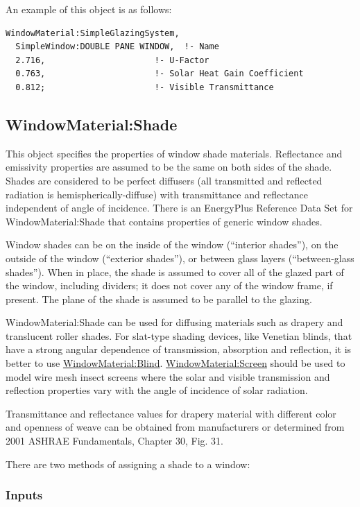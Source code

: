 An example of this object is as follows:

\begin{lstlisting}
WindowMaterial:SimpleGlazingSystem,
  SimpleWindow:DOUBLE PANE WINDOW,  !- Name
  2.716,                      !- U-Factor
  0.763,                      !- Solar Heat Gain Coefficient
  0.812;                      !- Visible Transmittance
\end{lstlisting}

\subsection{WindowMaterial:Shade}\label{windowmaterialshade}

This object specifies the properties of window shade materials. Reflectance and emissivity properties are assumed to be the same on both sides of the shade. Shades are considered to be perfect diffusers (all transmitted and reflected radiation is hemispherically-diffuse) with transmittance and reflectance independent of angle of incidence. There is an EnergyPlus Reference Data Set for WindowMaterial:Shade that contains properties of generic window shades.

Window shades can be on the inside of the window (``interior shades''), on the outside of the window (``exterior shades''), or between glass layers (``between-glass shades''). When in place, the shade is assumed to cover all of the glazed part of the window, including dividers; it does not cover any of the window frame, if present. The plane of the shade is assumed to be parallel to the glazing.

WindowMaterial:Shade can be used for diffusing materials such as drapery and translucent roller shades. For slat-type shading devices, like Venetian blinds, that have a strong angular dependence of transmission, absorption and reflection, it is better to use \hyperref[windowmaterialblind]{WindowMaterial:Blind}. \hyperref[windowmaterialscreen]{WindowMaterial:Screen} should be used to model wire mesh insect screens where the solar and visible transmission and reflection properties vary with the angle of incidence of solar radiation.

Transmittance and reflectance values for drapery material with different color and openness of weave can be obtained from manufacturers or determined from 2001 ASHRAE Fundamentals, Chapter 30, Fig. 31.

There are two methods of assigning a shade to a window:

\subsubsection{Inputs}\label{inputs-22-005}

